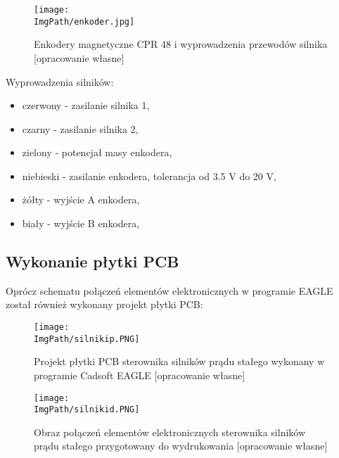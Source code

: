 \documentclass[a4paper,12pt,twoside,openany]{report}
\newcommand{\ImgPath}{.}
\begin{document}
\begin{figure}[!htbp]
	\begin{center}
\centering
\texttt{[image: \\ImgPath/enkoder.jpg]}
\end{center}
	\caption{Enkodery magnetyczne CPR 48 i wyprowadzenia przewodów silnika [opracowanie własne]}
	\label{schematKomunikacji}
\end{figure}

Wyprowadzenia silników:
\begin{itemize}
\item czerwony - zasilanie silnika 1,
\item czarny - zasilanie silnika 2,
\item zielony - potencjał masy enkodera,
\item niebieski - zasilanie enkodera, tolerancja od 3.5 V do 20 V,
\item żółty - wyjście A enkodera,
\item biały - wyjście B enkodera,
\end{itemize}

\newpage

\subsection{Wykonanie płytki PCB}

Oprócz schematu połączeń elementów elektronicznych w programie EAGLE został również wykonany projekt płytki PCB:

\begin{figure}[!htbp]
	\begin{center}
\centering
\texttt{[image: \\ImgPath/silnikip.PNG]}
\end{center}
	\caption{Projekt płytki PCB sterownika silników prądu stałego wykonany w programie Cadsoft EAGLE [opracowanie własne]}
	\label{schematKomunikacji}
\end{figure}

\begin{figure}[!htbp]
	\begin{center}
\centering
\texttt{[image: \\ImgPath/silnikid.PNG]}
\end{center}
	\caption{Obraz połączeń elementów elektronicznych sterownika silników prądu stałego przygotowany do wydrukowania [opracowanie własne]}
	\label{schematKomunikacji}
\end{figure}
\end{document}
